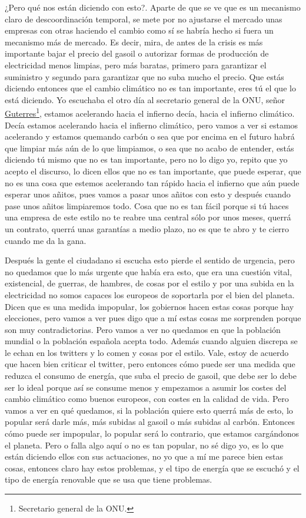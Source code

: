 ¿Pero qué nos están diciendo con esto?. Aparte de que se ve que es un mecanismo claro de descoordinación temporal, se mete por no ajustarse el mercado unas empresas con otras haciendo el cambio como sí se habría hecho si fuera un mecanismo más de mercado. Es decir, mira, de antes de la crisis es más importante bajar el precio del gasoil o autorizar formas de producción de electricidad menos limpias, pero más baratas, primero para garantizar el suministro y segundo para garantizar que no suba mucho el precio. Que estás diciendo entonces que el cambio climático no es tan importante, eres tú el que lo está diciendo. Yo escuchaba el otro día al secretario general de la ONU, señor \href{https://en.wikipedia.org/wiki/Ant%C3%B3nio_Guterres}{Guterres}\footnote{Secretario general de la ONU.}, estamos acelerando hacia el infierno decía, hacia el infierno climático. Decía estamos acelerando hacia el infierno climático, pero vamos a ver si estamos acelerando y estamos quemando carbón o sea que por encima en el futuro habrá que limpiar más aún de lo que limpiamos, o sea que no acabo de entender, estás diciendo tú mismo que no es tan importante, pero no lo digo yo, repito que yo acepto el discurso, lo dicen ellos que no es tan importante, que puede esperar, que no es una cosa que estemos acelerando tan rápido hacia el infierno que aún puede esperar unos añitos, pues vamos a pasar unos añitos con esto y después cuando pase unos añitos limpiaremos todo. Cosa que no es tan fácil porque si tú haces una empresa de este estilo no te reabre una central sólo por unos meses, querrá un contrato, querrá unas garantías a medio plazo, no es que te abro y te cierro cuando me da la gana.

Después la gente el ciudadano si escucha esto pierde el sentido de urgencia, pero no quedamos que lo más urgente que había era esto, que era una cuestión vital, existencial, de guerras, de hambres, de cosas por el estilo y por una subida en la electricidad no somos capaces los europeos de soportarla por el bien del planeta. Dicen que es una medida impopular, los gobiernos hacen estas cosas porque hay elecciones, pero vamos a ver pues digo que a mí estas cosas me sorprenden porque son muy contradictorias. Pero vamos a ver no quedamos en que la población mundial o la población española acepta todo. Además cuando alguien discrepa se le echan en los twitters y lo comen y cosas por el estilo. Vale, estoy de acuerdo que hacen bien criticar el twitter, pero entonces cómo puede ser una medida que reduzca el consumo de energía, que suba el precio de gasoil, que debe ser lo debe ser lo ideal porque así se consume menos y empezamos a asumir los costes del cambio climático como buenos europeos, con costes en la calidad de vida. Pero vamos a ver en qué quedamos, si la población quiere esto querrá más de esto, lo popular será darle más, más subidas al gasoil o más subidas al carbón. Entonces cómo puede ser impopular, lo popular será lo contrario, que estamos cargándonos el planeta. Pero o falla algo aquí o no es tan popular, no sé digo yo, es lo que están diciendo ellos con sus actuaciones, no yo que a mí me parece bien estas cosas, entonces claro hay estos problemas, y el tipo de energía que se escuchó y el tipo de energía renovable que se usa que tiene problemas.

